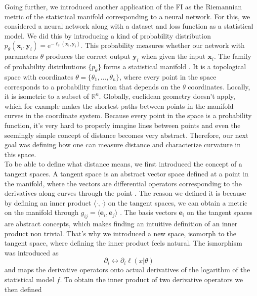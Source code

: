 Going further, we introduced another application of the FI as the Riemannian metric of the statistical manifold corresponding to a neural network. For this, we considered a neural network along with a dataset and loss function as a statistical model. We did this by introducing a kind of probability distribution $p_\theta(\mathbf{x}_i,\mathbf{y}_i) = \mathrm{e}^{-\ell_\theta(\mathbf{x}_i,\mathbf{y}_i)}$. This probability measures whether our network with parameters $\theta$ produces the correct output $\mathbf{y}_i$ when given the input $\mathbf{x}_i$. The family of probability distributions $\{p_\theta\}$ forms a statistical manifold \cite{AmarisLectureNotes}. It is a topological space with coordinates $\theta = \{\theta_1, \ldots, \theta_n\}$, where every point in the space corresponds to a probability function that depends on the $\theta$ coordinates. Locally, it is isometric to a subset of $\mathbb{R}^n$. Globally, euclidean geometry doesn't apply, which for example makes the shortest paths between points in the manifold curves in the coordinate system. Because every point in the space is a probability function, it's very hard to properly imagine lines between points and even the seemingly simple concept of distance becomes very abstract. Therefore, our next goal was defining how one can measure distance and characterize curvature in this space.\\
To be able to define what distance means, we first introduced the concept of a tangent spaces. A tangent space is an abstract vector space defined at a point in the manifold, where the vectors are differential operators corresponding to the derivatives along curves through the point \cite{AmarisLectureNotes}. The reason we defined it is because by defining an inner product $\langle \cdot , \cdot \rangle$ on the tangent spaces, we can obtain a metric on the manifold through $g_{ij} = \langle \mathbf{e}_i,\mathbf{e}_j\rangle$ \cite{AmarisLectureNotes}. The basis vectors $\mathbf{e}_i$ on the tangent spaces are abstract concepts, which makes finding an intuitive definition of an inner product non trivial. That's why we introduced a new space, isomorph to the tangent space, where defining the inner product feels natural. The ismorphism was introduced as \cite{AmarisLectureNotes}
\begin{equation}
	\partial_i \leftrightarrow \partial_i \ell(x|\theta)
\end{equation}
and maps the derivative operators onto actual derivatives of the logarithm of the statistical model $f$. To obtain the inner product of two derivative operators we then defined \cite{AmarisLectureNotes}
